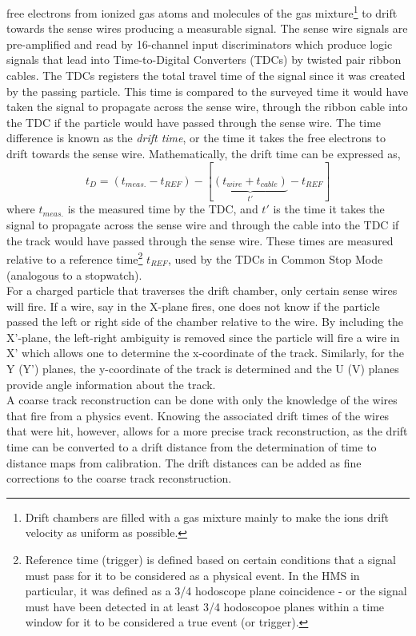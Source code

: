 \documentclass[journal, a4paper]{IEEEtran}
\begin{document}
free electrons from ionized gas atoms and molecules of
the gas mixture\footnote{Drift chambers are filled with a gas mixture mainly to make the ions drift velocity
as uniform as possible.} to drift towards the sense wires producing a measurable signal.
The sense wire signals are pre-amplified and read by 16-channel input discriminators which produce logic signals that lead into Time-to-Digital
Converters (TDCs) by twisted pair ribbon cables\cite{meekins}. The TDCs registers the total travel time
of the signal since it was created by the passing particle. This time is compared to the surveyed time it would have taken the signal to propagate across
the sense wire, through the ribbon cable into the TDC if the particle would have passed through the sense wire. The time difference
is known as the \textit{drift time}, or the time it takes the free electrons to drift towards the sense wire.
 Mathematically, the drift time can be expressed as,
\begin{equation}
t_{D} = (t_{meas.}-t_{REF}) - [\underbrace{(t_{wire} + t_{cable})}_{t'} - t_{REF}]
\end{equation}
where $t_{meas.}$ is the measured time by the TDC, and $t'$ is the time it takes the signal to propagate
across the sense wire and through the cable into the TDC if the track would have passed through the sense wire. These times
are measured relative to a reference time\footnote{Reference time (trigger) is defined based on certain conditions that
a signal must pass for it to be considered as a physical event. In the HMS in particular, it was defined as a 3/4
hodoscope plane coincidence - or the signal must have been detected in at least 3/4 hodoscopoe planes within a
time window for it to be considered a true event (or trigger).} $t_{REF}$, used by the TDCs in Common Stop Mode (analogous to
a stopwatch). \\
\indent For a charged particle that traverses the drift chamber, only certain sense wires will fire.
If a wire, say in the X-plane fires, one does not know if the particle passed the left or right side of the chamber
relative to the wire. By including the X'-plane, the left-right ambiguity is removed since the particle will fire a wire in X' which
allows one to determine the x-coordinate of the track. Similarly, for the Y (Y') planes, the y-coordinate of the track is
determined and the U (V) planes provide angle information about the track.\\
\indent A coarse track reconstruction can be done with only the knowledge of the wires that fire from a physics
event. Knowing the associated drift times of the wires that were hit, however, allows for a more precise track reconstruction,
as the drift time can be converted to a drift distance from the determination of time to distance maps from calibration. The
drift distances can be added as fine corrections to the coarse track reconstruction.
\end{document}
